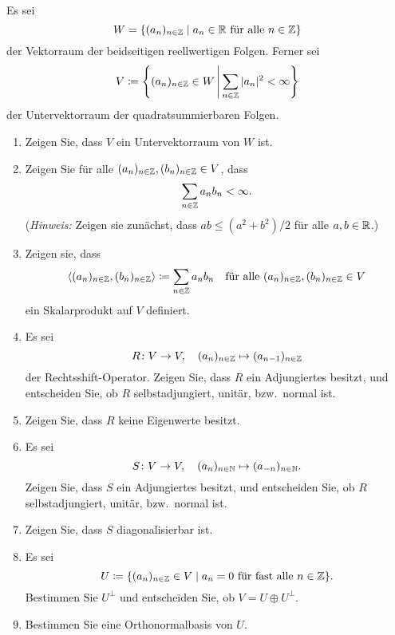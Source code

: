 \documentclass[a4paper,10pt]{scrartcl}
\begin{document}
\begin{question}
  Es sei
  \[
    W = \{(a_n)_{n \in \mathbb{Z}} \mid \text{$a_n \in \mathbb{R}$ für alle $n \in \mathbb{Z}$}\}
  \]
  der Vektorraum der beidseitigen reellwertigen Folgen.
  Ferner sei
  \[
    V \coloneqq
    \left\{
      (a_n)_{n \in \mathbb{Z}} \in W
    \,\middle|\,
      \sum_{n \in \mathbb{Z}} |a_n|^2 < \infty
   \right\}
  \]
  der Untervektorraum der quadratsummierbaren Folgen.
  \begin{enumerate}[leftmargin=*]
    \item
      Zeigen Sie, dass $V$ ein Untervektorraum von $W$ ist.
    \item
      Zeigen Sie für alle $(a_n)_{n \in \mathbb{Z}}, (b_n)_{n \in \mathbb{Z}} \in V$, dass
      \[
        \sum_{n \in \mathbb{Z}} a_n b_n < \infty.
      \]
      (\emph{Hinweis:} Zeigen sie zunächst, dass $ab \leq (a^2 + b^2)/2$ für alle $a, b \in \mathbb{R}$.)
    \item
      Zeigen sie, dass
      \[
                  \langle  (a_n)_{n \in \mathbb{Z}}, (b_n)_{n \in \mathbb{Z}}  \rangle
        \coloneqq \sum_{n \in \mathbb{Z}} a_n b_n
        \quad
        \text{für alle $(a_n)_{n \in \mathbb{Z}}, (b_n)_{n \in \mathbb{Z}} \in V$}
      \]
      ein Skalarprodukt auf $V$ definiert.
    \item
      Es sei
      \[
        R \colon V \to V,
        \quad
        (a_n)_{n \in \mathbb{Z}} \mapsto (a_{n-1})_{n \in \mathbb{Z}}
      \]
      der Rechtsshift-Operator.
      Zeigen Sie, dass $R$ ein Adjungiertes besitzt, und entscheiden Sie, ob $R$ selbstadjungiert, unitär, bzw.\ normal ist.
    \item
      Zeigen Sie, dass $R$ keine Eigenwerte besitzt.
    \item
      Es sei
      \[
        S \colon V \to V,
        \quad
        (a_n)_{n \in \mathbb{N}} \mapsto (a_{-n})_{n \in \mathbb{N}}.
      \]
      Zeigen Sie, dass $S$ ein Adjungiertes besitzt, und entscheiden Sie, ob $R$ selbstadjungiert, unitär, bzw.\ normal ist.
    \item
      Zeigen Sie, dass $S$ diagonalisierbar ist.
    \item
      Es sei
      \[
        U \coloneqq \{(a_n)_{n \in \mathbb{Z}} \in V \mid \text{$a_n = 0$ für fast alle $n \in \mathbb{Z}$}\}.
      \]
      Bestimmen Sie $U^\perp$ und entscheiden Sie, ob $V = U \oplus U^\perp$.
    \item
      Bestimmen Sie eine Orthonormalbasis von $U$.
  \end{enumerate}
\end{question}
\end{document}
